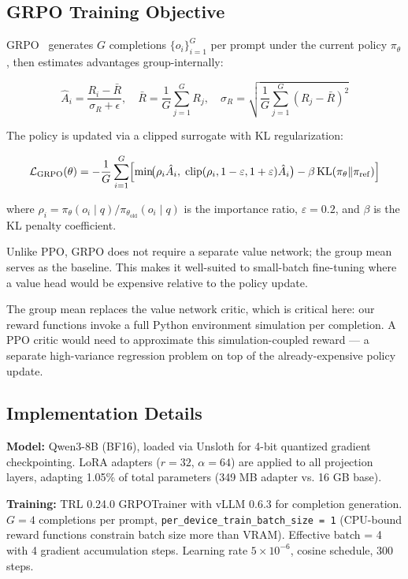\documentclass{article}
\begin{document}
\subsection{GRPO Training Objective}

GRPO~\cite{shao2024} generates $G$ completions $\{o_i\}_{i=1}^G$ per prompt under the
current policy $\pi_\theta$, then estimates advantages group-internally:

\[
\hat{A}_i = \frac{R_i - \bar{R}}{\sigma_R + \epsilon}, \quad \bar{R} = \frac{1}{G}\sum_{j=1}^G R_j, \quad \sigma_R = \sqrt{\frac{1}{G}\sum_{j=1}^G (R_j - \bar{R})^2}
\]

The policy is updated via a clipped surrogate with KL regularization:

\[
\mathcal{L}_{\mathrm{GRPO}}(\theta) = -\frac{1}{G}\sum_{i=1}^G \Bigl[ \min\!\bigl(\rho_i \hat{A}_i,\; \mathrm{clip}(\rho_i, 1-\varepsilon, 1+\varepsilon)\hat{A}_i\bigr) - \beta\, \mathrm{KL}(\pi_\theta \| \pi_{\mathrm{ref}}) \Bigr]
\]

where $\rho_i = \pi_\theta(o_i \mid q) / \pi_{\theta_{\mathrm{old}}}(o_i \mid q)$ is
the importance ratio, $\varepsilon = 0.2$, and $\beta$ is the KL penalty coefficient.

Unlike PPO, GRPO does not require a separate value network; the group mean serves as the
baseline. This makes it well-suited to small-batch fine-tuning where a value head would
be expensive relative to the policy update.

The group mean replaces the value network critic, which is critical here: our reward
functions invoke a full Python environment simulation per completion. A PPO critic would
need to approximate this simulation-coupled reward --- a separate high-variance
regression problem on top of the already-expensive policy update.

\subsection{Implementation Details}

\textbf{Model:} Qwen3-8B (BF16), loaded via Unsloth for 4-bit quantized gradient
checkpointing. LoRA adapters ($r = 32$, $\alpha = 64$) are applied to all projection
layers, adapting 1.05\% of total parameters (349 MB adapter vs. 16 GB base).

\textbf{Training:} TRL 0.24.0 GRPOTrainer with vLLM 0.6.3 for completion generation.
$G = 4$ completions per prompt, \texttt{per\_device\_train\_batch\_size = 1}
(CPU-bound reward functions constrain batch size more than VRAM). Effective batch = 4
with 4 gradient accumulation steps. Learning rate $5 \times 10^{-6}$, cosine schedule,
300 steps.
\end{document}
